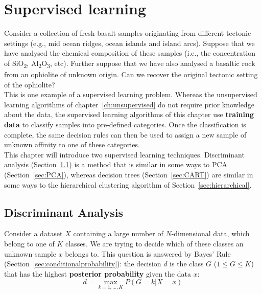 \chapter{Supervised learning}
\label{ch:supervised}

Consider a collection of fresh basalt samples originating from
different tectonic settings (e.g., mid ocean ridges, ocean islands and
island arcs).  Suppose that we have analysed the chemical composition
of these samples (i.e., the concentration of SiO\textsubscript{2},
Al\textsubscript{2}O\textsubscript{3}, etc). Further suppose that we
have also analysed a basaltic rock from an ophiolite of unknown
origin.  Can we recover the original tectonic setting of the
ophiolite?\\

This is one example of a supervised learning problem. Whereas the
unsupervised learning algorithms of chapter~\ref{ch:unsupervised} do
not require prior knowledge about the data, the supervised learning
algorithms of this chapter use \textbf{training data} to classify
samples into pre-defined categories. Once the classification is
complete, the same decision rules can then be used to assign a new
sample of unknown affinity to one of these categories.\\

This chapter will introduce two supervised learning techniques.
Discriminant analysis (Section~\ref{sec:LDA}) is a method that is
similar in some ways to PCA (Section~\ref{sec:PCA}), whereas decision
trees (Section~\ref{sec:CART}) are similar in some ways to the
hierarchical clustering algorithm of Section~\ref{sec:hierarchical}.

\section{Discriminant Analysis}
\label{sec:LDA}

Consider a dataset $X$ containing a large number of $N$-dimensional
data, which belong to one of $K$ classes. We are trying to decide
which of these classes an unknown sample $x$ belongs to.  This
question is answered by Bayes' Rule
(Section~\ref{sec:conditionalprobability}): the decision $d$ is the
class $G$ ($1 \leq G \leq K$) that has the highest \textbf{posterior
  probability} given the data $x$:
\begin{equation}
  \label{eq:bayesRule}
  d = \underset{k=1,\ldots,K}{\max} P(G=k|X=x)
\end{equation}

